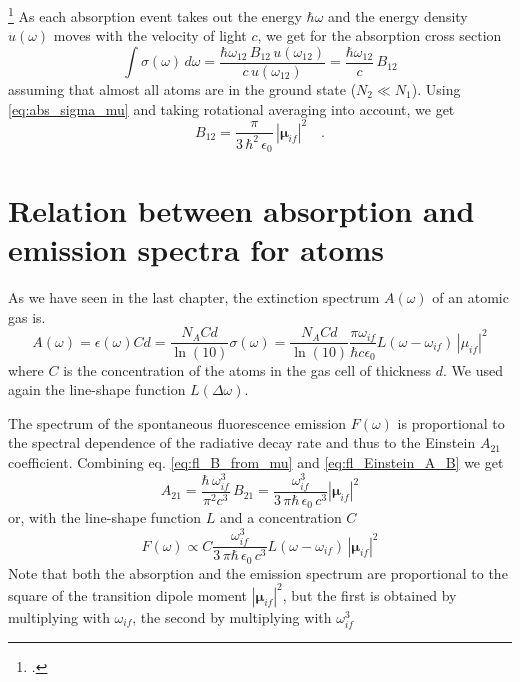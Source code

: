  \footcite{Hilborn:2002wj} 
 As each absorption event takes out the energy $\hbar \omega$ and the energy density $u(\omega)$ moves with the velocity of light $c$, we get for the absorption cross section
\begin{equation}
\int \sigma(\omega) \, d \omega = \frac{\hbar \omega_{12} \, B_{12} \, u(\omega_{12})  }{c \, u(\omega_{12}) }  =
   \frac{\hbar \omega_{12}  }{c  }    \, B_{12}
\end{equation}
assuming that almost all atoms are in the ground state ($N_2 \ll N_1$). Using \ref{eq:abs_sigma_mu} and taking rotational averaging into account, we get
\begin{equation}
B_{12} = \frac{\pi}{3 \, \hbar^2 \, \epsilon_0} \,  |\mathbf{\mu}_{if} |^2  \quad . \label{eq:fl_B_from_mu}
\end{equation}

\section{Relation between absorption and emission spectra for atoms}

As we have seen in the last chapter, the extinction spectrum $A(\omega)$ of an atomic gas is.
\begin{equation}
A(\omega) = \epsilon(\omega) C d = \frac{N_A C d}{\ln(10)} \sigma(\omega) = \frac{N_A C d}{\ln(10)}
\frac{\pi \omega_{if}}{ \hbar c \epsilon_0}
  L(\omega - \omega_{if}) \, | \mu_{if} |^2 \label{eq:fl_absspec}
\end{equation}
where $C$ is the concentration of the atoms in the gas cell of thickness $d$. We used  again the line-shape function $L(\Delta \omega)$.

The  spectrum of the spontaneous fluorescence emission $F(\omega)$ is proportional to the spectral dependence of the radiative decay rate and thus to the  Einstein $A_{21}$ coefficient.
Combining eq. \ref{eq:fl_B_from_mu} and \ref{eq:fl_Einstein_A_B}
we get
\begin{equation}
 A_{21} =  \frac{\hbar \, \omega_{if}^3}{\pi^2 c^3} \, B_{21}  = 
\frac{ \omega_{if}^3}{3 \, \pi \hbar \, \epsilon_0 \, c^3}    |\mathbf{\mu}_{if} |^2  
\end{equation}
or, with the line-shape function $L$ and a concentration $C$
\begin{equation}
F(\omega) \propto C \frac{ \omega_{if}^3}{3 \, \pi \hbar \, \epsilon_0 \, c^3}   L(\omega - \omega_{if}) \,   |\mathbf{\mu}_{if} |^2  \label{eq:fl_emspec}
\end{equation}
Note that both the absorption and the emission spectrum are proportional to the square of the transition dipole moment $|\mathbf{\mu}_{if} |^2 $, but the first is obtained by multiplying with $\omega_{if}$, the second by multiplying with $\omega_{if}^3$


